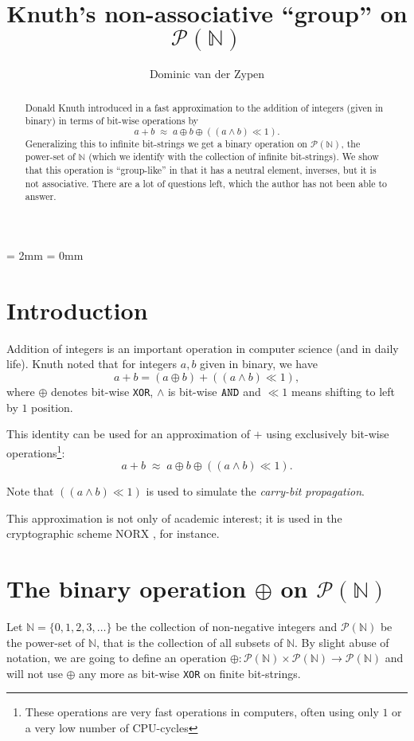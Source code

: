 \documentclass[12pt]{amsart}
\begin{document}
\def\Sym{\text{Sym}(\mathbb{N})}
\def\N{\mathbb{N}}
\def\PN{\mathcal{P}(\N)}
\def\str{\text{stretch}}
\parskip = 2mm
\parindent = 0mm
\title{Knuth's non-associative ``group'' on $\PN$}
\begin{abstract}Donald Knuth introduced in \cite{taocp4a} a fast approximation 
to the addition of integers (given in binary)
in terms of bit-wise operations by 
	$$a + b \; \approx \; a \oplus b \oplus ((a\land b) \ll 1).$$
Generalizing this to infinite bit-strings
we get a binary operation on $\PN$, the power-set of $\N$ (which we identify 
with the collection of infinite bit-strings). We show that this operation 
is ``group-like''
in that it has a neutral element, inverses, but it is not associative. 
There are a lot of questions left, which the author has not been able to 
answer.
\end{abstract}
\author{Dominic van der Zypen}
\maketitle
\section{Introduction}
Addition of integers  is an important operation in computer science (and in 
daily life).
Knuth \cite{taocp4a} noted that for integers $a,b$ given in binary, we have 
$$a + b = (a\oplus b) + ((a \land b) \ll 1),$$
where $\oplus$ denotes bit-wise {\tt XOR}, $\land$ is bit-wise ${\tt AND}$ and 
$\ll 1$ means shifting to left by $1$ position. 

This identity can be used for an approximation of $+$ using exclusively
bit-wise operations\footnote{These
operations are very fast operations in computers, often using only $1$ or a very 
low number of CPU-cycles}:
	$$a + b \; \approx \; a \oplus b \oplus ((a\land b) \ll 1).$$

Note that $((a\land b)\ll 1)$ is used to simulate the {\em carry-bit 
propagation}.

This approximation is not only of academic interest;
it is used in the cryptographic scheme NORX \cite{norx},
for instance.
\section{The binary operation $\oplus$ on $\PN$}
Let $\N = \{0,1,2,3,\ldots\}$ be the collection of non-negative integers 
and $\PN$ be
the power-set of $\N$, that is the collection of all subsets of $\N$.
By slight abuse of notation, we are going to define an operation 
$\oplus:\PN\times\PN \to \PN$ and will not use $\oplus$ any more 
as bit-wise {\tt XOR} on finite bit-strings.
\end{document}
